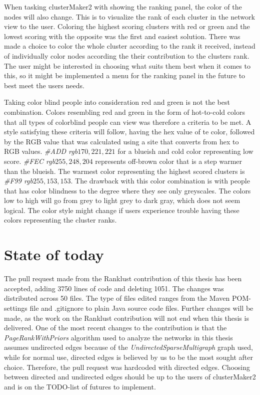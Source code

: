 When tasking clusterMaker2 with showing the ranking panel, the color of the
nodes will also change. This is to visualize the rank of each cluster in the
network view to the user. Coloring the highest scoring clusters with red or
green and the lowest scoring with the opposite was the first and easiest
solution. There was made a choice to color the whole cluster according to the
rank it received, instead of individually color nodes according the their
contribution to the clusters rank. The user might be interested in choosing what
suits them best when it comes to this, so it might be implemented a menu for the
ranking panel in the future to best meet the users needs.

Taking color blind people into consideration red and green is not the
best combination. Colors resembling red and green in the form of hot-to-cold
colors that all types of colorblind people can view was therefore a criteria to
be met. A style satisfying these criteria will follow, having the hex value of
te color\cite{color-blindness3}, followed by the RGB value that was calculated
using a site that converts from hex to RGB values\cite{color-blindness2}.
\textit{\#ADD rgb\(170,221,221\)} for a blueish and cold color representing low
score. \textit{\#FEC rgb\(255,248,204\)} represents off-brown color that is a step
warmer than the blueish. The warmest color representing the highest scored
clusters is \textit{\#F99 rgb\(255,153,153\)}. The drawback with this color
combination is with people that has color blindness to the degree where they see
only greyscales. The colors low to high will go from grey to light grey to dark
gray, which does not seem logical. The color style might change if users
experience trouble having these colors representing the cluster ranks. 

\section{State of today}
The pull request\cite{git-pull-request} made from the Ranklust
contribution of this thesis has been accepted\cite{ranklust-accepted}, adding
3750 lines of code and deleting 1051. The changes was distributed across 50
files. The type of files edited ranges from the Maven POM-settings file and
.gitignore to plain Java source code files. Further changes will be made, as the
work on the Ranklust contribution will not end when this thesis is delivered.
One of the most recent changes to the contribution is that the
\textit{PageRankWithPriors} algorithm used to analyze the networks in this
thesis assumes undirected edges because of the
\textit{UndirectedSparseMultigraph} graph used, while for normal use, directed
edges is believed by us to be the most sought after choice. Therefore, the pull
request was hardcoded with directed edges. Choosing between directed and
undirected edges should be up to the users of clusterMaker2 and is on the
TODO-list of futures to implement.

